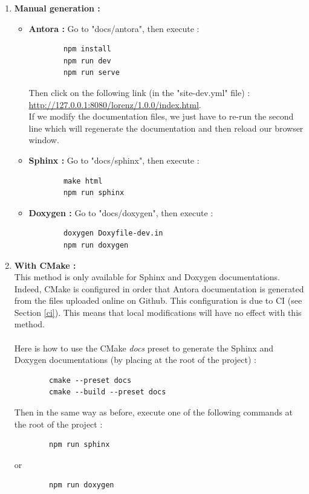 	\begin{enumerate}[label=\textbullet]
		\item \textbf{Manual generation :} 
		\begin{itemize}[label=-]
			\item \textbf{Antora :} Go to "docs/antora", then execute :
\begin{lstlisting}
		npm install
		npm run dev
		npm run serve
\end{lstlisting}
			Then click on the following link (in the "site-dev.yml" file) : \\ \url{http://127.0.0.1:8080/lorenz/1.0.0/index.html}. \\
			If we modify the documentation files, we just have to re-run the second line which will regenerate the documentation and then reload our browser window.
			\item \textbf{Sphinx :} Go to "docs/sphinx", then execute :
\begin{lstlisting}
		make html
		npm run sphinx
\end{lstlisting}
			\item \textbf{Doxygen :} Go to "docs/doxygen", then execute :
\begin{lstlisting}
		doxygen Doxyfile-dev.in
		npm run doxygen
\end{lstlisting}
		\end{itemize}
		\newpage
		\item \textbf{With CMake :} \\
		\danger This method is only available for Sphinx and Doxygen documentations. Indeed, CMake is configured in order that Antora documentation is generated from the files uploaded online on Github. This configuration is due to CI (see Section \ref{ci}). This means that local modifications will have no effect with this method. \\ \; \\
		Here is how to use the CMake \textit{docs} preset to generate the Sphinx and Doxygen documentations (by placing at the root of the project) :
\begin{lstlisting}
		cmake --preset docs
		cmake --build --preset docs
\end{lstlisting}
		Then in the same way as before, execute one of the following commands at the root of the project :
\begin{lstlisting}
		npm run sphinx
\end{lstlisting}
		or
\begin{lstlisting}
		npm run doxygen
\end{lstlisting}
	\end{enumerate}

